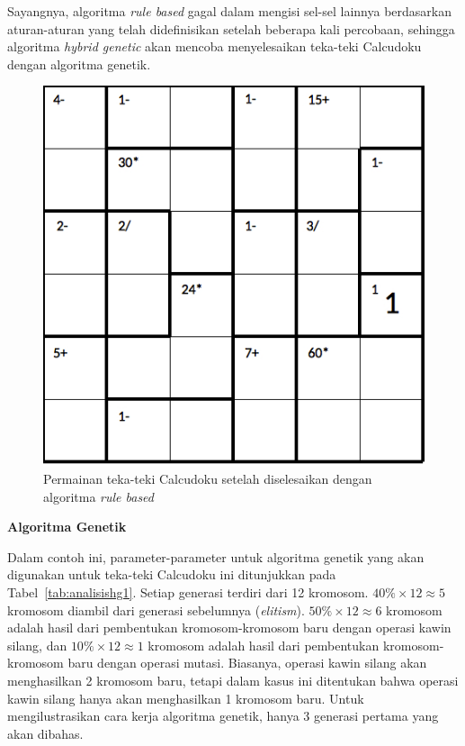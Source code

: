 \documentclass[a4paper,twoside]{article}
\begin{document}
\begin{enumerate}
Sayangnya, algoritma \textit{rule based} gagal dalam mengisi sel-sel lainnya berdasarkan aturan-aturan yang telah didefinisikan setelah beberapa kali percobaan, sehingga algoritma \textit{hybrid genetic} akan mencoba menyelesaikan teka-teki Calcudoku dengan algoritma genetik.

\begin{figure}
\centering
\captionsetup{justification=centering}
\includegraphics[scale=0.333]{Gambar/hybridgenetic/PuzzleAfterRuleBased}
\caption[Permainan teka-teki Calcudoku setelah diselesaikan dengan algoritma \textit{rule based}]{Permainan teka-teki Calcudoku setelah diselesaikan dengan algoritma \textit{rule based}}
\label{fig:analisishg2}
\end{figure}

\textbf{Algoritma Genetik}

Dalam contoh ini, parameter-parameter untuk algoritma genetik yang akan digunakan untuk teka-teki Calcudoku ini ditunjukkan pada Tabel~\ref{tab:analisishg1}. Setiap generasi terdiri dari 12 kromosom. \begin{math}40\% \times 12 \approx 5\end{math} kromosom diambil dari generasi sebelumnya (\textit{elitism}). \begin{math}50\% \times 12 \approx 6\end{math} kromosom adalah hasil dari pembentukan kromosom-kromosom baru dengan operasi kawin silang, dan \begin{math}10\% \times 12 \approx 1\end{math} kromosom adalah hasil dari pembentukan kromosom-kromosom baru dengan operasi mutasi. Biasanya, operasi kawin silang akan menghasilkan 2 kromosom baru, tetapi dalam kasus ini ditentukan bahwa operasi kawin silang hanya akan menghasilkan 1 kromosom baru. Untuk mengilustrasikan cara kerja algoritma genetik, hanya 3 generasi pertama yang akan dibahas.


\end{enumerate}
\end{document}
